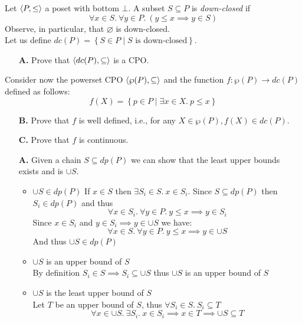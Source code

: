 \begin{exercise}{
    Let $\left< P, \leq \right>$ a poset with bottom $\bot$. A subset $S \subseteq P$ is \textit{down-closed} if
    \[ \forall x \in S.\ \forall y \in P.\ (y \leq x \implies y \in S) \]
    Observe, in particular, that $\varnothing$ is down-closed. \\
    Let us define $dc(P) = \left\{S \in P \mid S \text{ is down-closed}\right\}$.
    \begin{enumerate}
        \item[\textbf{A.}] Prove that $\left< dc(P), \subseteq \right>$ is a CPO.
    \end{enumerate}
    Consider now the powerset CPO $\left< \wp(P), \subseteq \right>$ and the function $f : \wp(P) \to dc(P)$ defined as follows:
    \[ f(X) = \left\{ p \in P \mid \exists x \in X.\ p \leq x \right\} \]
    \begin{enumerate}
        \item[\textbf{B.}] Prove that $f$ is well defined, i.e., for any $X \in \wp(P), f(X) \in dc(P)$.
        \item[\textbf{C.}] Prove that $f$ is continuous.
    \end{enumerate}
}
    \begin{enumerate}
        \item[\textbf{A.}]
            Given a chain $S \subseteq dp(P)$ we can show that the least upper bounds exists and is $\cup S$.
            \begin{itemize}
                \item $\cup S \in dp(P)$
                    If $x \in S$ then $\exists S_i \in S.\ x \in S_i$. Since $S \subseteq dp(P)$ then $S_i \in dp(P)$ and thus
                    \[ \forall x \in S_i.\ \forall y \in P.\ y \leq x \implies y \in S_i \]
                    Since $x \in S_i$ and $y \in S_i \implies y \in \cup S$ we have:
                    \[ \forall x \in S.\ \forall y \in P.\ y \leq x \implies y \in \cup S \]
                    And thus $\cup S \in dp(P)$
                \item $\cup S$ is an upper bound of $S$ \\
                    By definition $S_i \in S \implies S_i \subseteq \cup S$ thus $\cup S$ is an upper bound of $S$
                \item $\cup S$ is the least upper bound of $S$ \\
                    Let $T$ be an upper bound of $S$, thus $\forall S_i \in S.\ S_i \subseteq T$
                    \[ \forall x \in \cup S.\ \exists S_i.\ x \in S_i \implies x \in T \implies \cup S \subseteq T \]

\end{itemize}
\end{enumerate}
\end{exercise}
